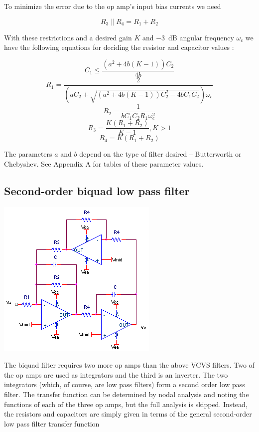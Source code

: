 To minimize the error due to the op amp's input bias currents we need

\begin{equation}
R_3 \parallel R_4 = R_1 + R_2
\end{equation}

With these restrictions and a desired gain $K$ and \SI{-3}{\dB} angular frequency $\omega_{c}$ we have the following equations for deciding the resistor and capacitor values \autocite[118-119]{op-amp-circuits-johnson}:

\begin{equation}
C_1 \leq \frac{(a^2+4b(K-1))C_2}{4b}
\end{equation}
\begin{equation}
R_1 = \frac{2}{(aC_2+\sqrt{(a^2+4b(K-1))C_2^2 - 4b C_1 C_2})\omega_{c}}
\end{equation}
\begin{equation}
R_2 = \frac{1}{bC_1 C_2 R_1\omega_{c}^2}
\end{equation}
\begin{equation}
R_3 = \frac{K(R_1 + R_2)}{K-1}, K > 1
\end{equation}
\begin{equation}
R_4 = K(R_1 + R_2)
\end{equation}

The parameters $a$ and $b$ depend on the type of filter desired -- Butterworth or Chebyshev. See Appendix A for tables of these parameter values.

\subsection{Second-order biquad low pass filter}
\begin{center}
	\includegraphics{schematics/2ndorderbiquadLPfilter.PNG}
\end{center}
The biquad filter requires two more op amps than the above VCVS filters. Two of the op amps are used as integrators and the third is an inverter. The two integrators (which, of course, are low pass filters) form a second order low pass filter. The transfer function can be determined by nodal analysis and noting the functions of each of the three op amps, but the full analysis is skipped. Instead, the resistors and capacitors are simply given in terms of the general second-order low pass filter transfer function

